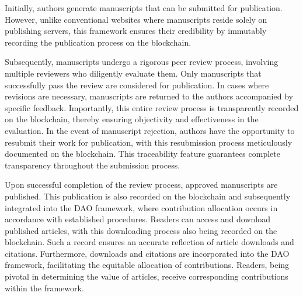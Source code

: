 \documentclass[lettersize,journal]{IEEEtran}
\begin{document}
Initially, authors generate manuscripts that can be submitted for publication. However, unlike conventional websites where manuscripts reside solely on publishing servers, this framework ensures their credibility by immutably recording the publication process on the blockchain. 

Subsequently, manuscripts undergo a rigorous peer review process, involving multiple reviewers who diligently evaluate them. Only manuscripts that successfully pass the review are considered for publication. In cases where revisions are necessary, manuscripts are returned to the authors accompanied by specific feedback. Importantly, this entire review process is transparently recorded on the blockchain, thereby ensuring objectivity and effectiveness in the evaluation. 
In the event of manuscript rejection, authors have the opportunity to resubmit their work for publication, with this resubmission process meticulously documented on the blockchain. This traceability feature guarantees complete transparency throughout the submission process. 

Upon successful completion of the review process, approved manuscripts are published. This publication is also recorded on the blockchain and subsequently integrated into the DAO framework, where contribution allocation occurs in accordance with established procedures. 
Readers can access and download published articles, with this downloading process also being recorded on the blockchain. Such a record ensures an accurate reflection of article downloads and citations. Furthermore, downloads and citations are incorporated into the DAO framework, facilitating the equitable allocation of contributions. Readers, being pivotal in determining the value of articles, receive corresponding contributions within the framework.
\end{document}
